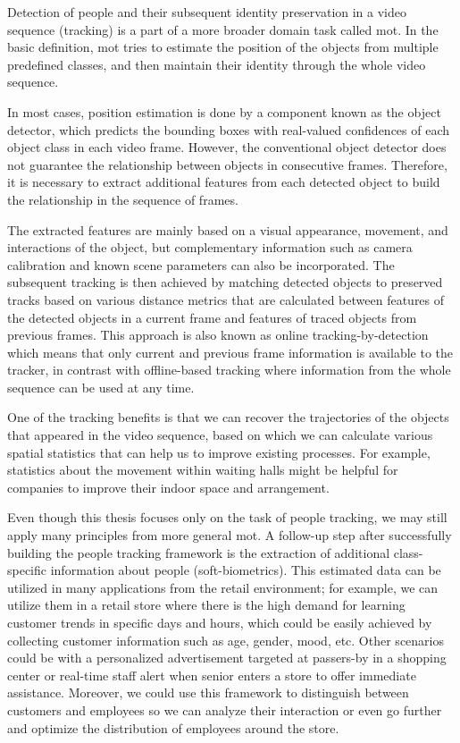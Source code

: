 \begin{introduction}

    Detection of people and their subsequent identity preservation in a video sequence (tracking) is a part of a more broader domain task called \gls{mot}. In the basic definition, \gls{mot} tries to estimate the position of the objects from multiple predefined classes, and then maintain their identity through the whole video sequence. 
    
    In most cases, position estimation is done by a component known as the object detector, which predicts the bounding boxes with real-valued confidences of each object class in each video frame. However, the conventional object detector does not guarantee the relationship between objects in consecutive frames. Therefore, it is necessary to extract additional features from each detected object to build the relationship in the sequence of frames. 
    
    The extracted features are mainly based on a visual appearance, movement, and interactions of the object, but complementary information such as camera calibration and known scene parameters can also be incorporated. The subsequent tracking is then achieved by matching detected objects to preserved tracks based on various distance metrics that are calculated between features of the detected objects in a current frame and features of traced objects from previous frames. This approach is also known as online tracking-by-detection which means that only current and previous frame information is available to the tracker, in contrast with offline-based tracking where information from the whole sequence can be used at any time. 
    
    One of the tracking benefits is that we can recover the trajectories of the objects that appeared in the video sequence, based on which we can calculate various spatial statistics that can help us to improve existing processes. For example, statistics about the movement within waiting halls might be helpful for companies to improve their indoor space and arrangement. 
    
    Even though this thesis focuses only on the task of people tracking, we may still apply many principles from more general \gls{mot}. A follow-up step after successfully building the people tracking framework is the extraction of additional class-specific information about people (soft-biometrics). This estimated data can be utilized in many applications from the retail environment; for example, we can utilize them in a retail store where there is the high demand for learning customer trends in specific days and hours, which could be easily achieved by collecting customer information such as age, gender, mood, etc. Other scenarios could be with a personalized advertisement targeted at passers-by in a shopping center or real-time staff alert when senior enters a store to offer immediate assistance. Moreover, we could use this framework to distinguish between customers and employees so we can analyze their interaction or even go further and optimize the distribution of employees around the store.
    

\end{introduction}
